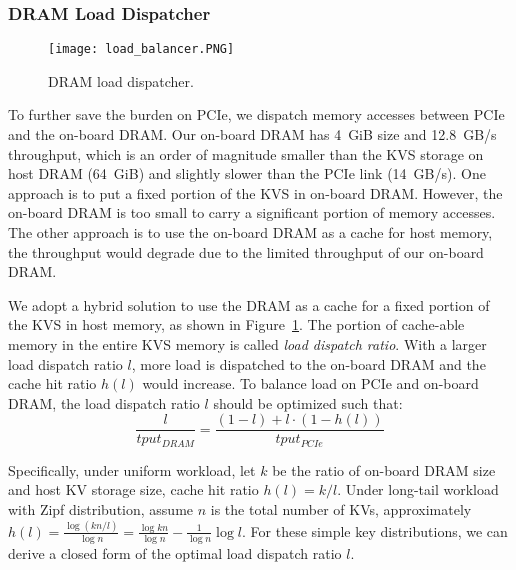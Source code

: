 \subsubsection{DRAM Load Dispatcher}
\label{sec:dram-cache}

\begin{figure}[t]
\centering
\texttt{[image: load\_balancer.PNG]}
\caption{DRAM load dispatcher.}
\label{fig:cache}
\vspace{-15pt}
\end{figure}

To further save the burden on PCIe, we dispatch memory accesses between PCIe and the on-board DRAM.
Our on-board DRAM has 4~GiB size and 12.8~GB/s throughput, which is an order of magnitude smaller than the KVS storage on host DRAM (64~GiB) and slightly slower than the PCIe link (14~GB/s).
One approach is to put a fixed portion of the KVS in on-board DRAM. However, the on-board DRAM is too small to carry a significant portion of memory accesses.
The other approach is to use the on-board DRAM as a cache for host memory, the throughput would degrade due to the limited throughput of our on-board DRAM.

We adopt a hybrid solution to use the DRAM as a cache for a fixed portion of the KVS in host memory, as shown in Figure~\ref{fig:cache}.
The portion of cache-able memory in the entire KVS memory is called \textit{load dispatch ratio}.
With a larger load dispatch ratio $l$, more load is dispatched to the on-board DRAM and the cache hit ratio $h(l)$ would increase.
To balance load on PCIe and on-board DRAM, the load dispatch ratio $l$ should be optimized such that:
$$\frac{l}{tput_{DRAM}} = \frac{(1-l) + l \cdot (1-h(l))}{tput_{PCIe}}$$

Specifically, under uniform workload, let $k$ be the ratio of on-board DRAM size and host KV storage size, cache hit ratio $h(l) = k/l$.
Under long-tail workload with Zipf distribution, assume $n$ is the total number of KVs, approximately $h(l) = \frac{\log (kn/l)}{\log n} = \frac{\log kn}{\log n} - \frac{1}{\log n}\log l$.
For these simple key distributions, we can derive a closed form of the optimal load dispatch ratio $l$.



